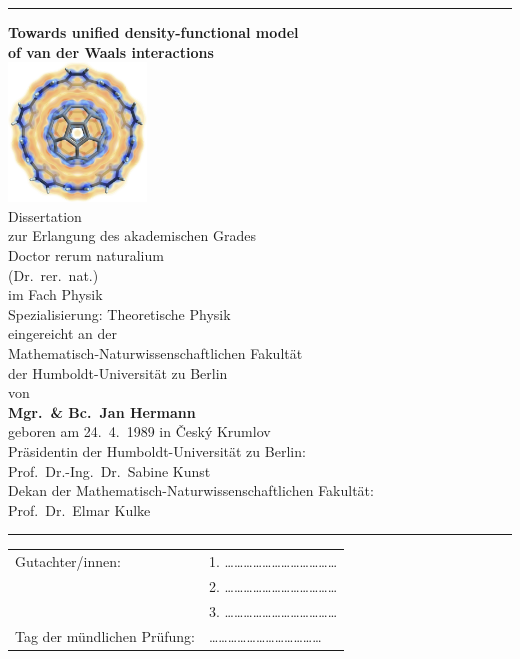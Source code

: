 







\begin{titlepage}
\sffamily
\hrule
\begin{center}
\vfill{\Large\bfseries Towards unified density-functional model\\of van der Waals interactions}\\
\vfill\includegraphics[height=10em]{media/10cpp-c60-cloud.png}\\
\vfill{\large Dissertation}\\[1em]
zur Erlangung des akademischen Grades \\[0.5em]
Doctor rerum naturalium \\
(Dr.\ rer.\ nat.) \\[0.5em]
im Fach Physik \\
{\small Spezialisierung: Theoretische Physik} \\[1em]
eingereicht an der \\
Mathematisch-Naturwissenschaftlichen Fakultät \\
der Humboldt-Universität zu Berlin \\[1em]
von \\[0.5em]
{\bfseries Mgr.\ \& Bc.\ Jan Hermann} \\[0.5em]
geboren am 24.\ 4.\ 1989 in Český Krumlov \\[2em]
{\small Präsidentin der Humboldt-Universität zu Berlin: \\
Prof.\ Dr.-Ing.\ Dr.\ Sabine Kunst \\[0.5em]
Dekan der Mathematisch-Naturwissenschaftlichen Fakultät: \\
Prof.\ Dr.\ Elmar Kulke}
\end{center}
\vfill
\hrule
\vspace{1cm}
\begin{tabular}{p{6cm}l}
Gutachter/innen: & 1. \ldots\ldots\ldots\ldots\ldots\ldots\ldots\ldots\ldots\ldots\ldots\ldots \\
& 2. \ldots\ldots\ldots\ldots\ldots\ldots\ldots\ldots\ldots\ldots\ldots\ldots \\
& 3. \ldots\ldots\ldots\ldots\ldots\ldots\ldots\ldots\ldots\ldots\ldots\ldots \\[1em]
Tag der mündlichen Prüfung: & \ldots\ldots\ldots\ldots\ldots\ldots\ldots\ldots\ldots\ldots\ldots\ldots
\end{tabular}
\end{titlepage}
\thispagestyle{empty}

